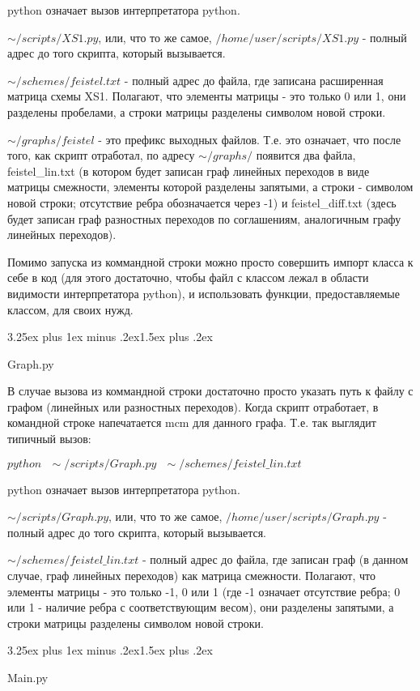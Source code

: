 \documentclass[a4paper,12pt]{report}
\makeatletter
\theoremstyle{plain} %
\theoremstyle{definition}
\theoremstyle{remark}
\renewcommand{\subsection}{\@startsection{subsection}{2}{18pt}%
{3.25ex plus 1ex minus .2ex}{1.5ex plus .2ex}%
{\normalfont\large\bfseries\raggedright}}%
\makeatother
\begin{document}
\begin{large}
python означает вызов интерпретатора python.

$\sim/scripts/XS1.py$, или, что то же самое, $/home/user/scripts/XS1.py$ - полный адрес до того скрипта, который вызывается.

$\sim/schemes/feistel.txt$ - полный адрес до файла, где записана расширенная матрица схемы XS1. Полагают, что элементы матрицы - это только 0 или 1, они разделены пробелами, а строки матрицы разделены символом новой строки.

$\sim/graphs/feistel$ - это префикс выходных файлов. Т.е. это означает, что после того, как скрипт отработал, по адресу $\sim/graphs/$ появится два файла, feistel\_lin.txt (в котором будет записан граф линейных переходов в виде матрицы смежности, элементы которой разделены запятыми, а строки - символом новой строки; отсутствие ребра обозначается через -1) и feistel\_diff.txt (здесь будет записан  граф разностных переходов по соглашениям, аналогичным графу линейных переходов).

Помимо запуска из коммандной строки можно просто совершить импорт класса к себе в код (для этого достаточно, чтобы файл с классом лежал в области видимости интерпретатора python), и использовать функции, предоставляемые классом, для своих нужд.

\subsection{Graph.py}

В случае вызова из коммандной строки достаточно просто указать путь к файлу с графом (линейных или разностных переходов). Когда скрипт отработает, в командной строке напечатается mcm для данного графа. Т.е. так выглядит типичный вызов:

$python ~~~\sim/scripts/Graph.py~~~ \sim/schemes/feistel\_lin.txt$

python означает вызов интерпретатора python.

$\sim/scripts/Graph.py$, или, что то же самое, $/home/user/scripts/Graph.py$ - полный адрес до того скрипта, который вызывается.

$\sim/schemes/feistel\_lin.txt$ - полный адрес до файла, где записан граф (в данном случае, граф линейных переходов) как матрица смежности. Полагают, что элементы матрицы - это только -1, 0 или 1 (где -1 означает отсутствие ребра; 0 или 1 - наличие ребра с соответствующим весом), они разделены запятыми, а строки матрицы разделены символом новой строки.

\subsection{Main.py}


\end{large}
\end{document}
